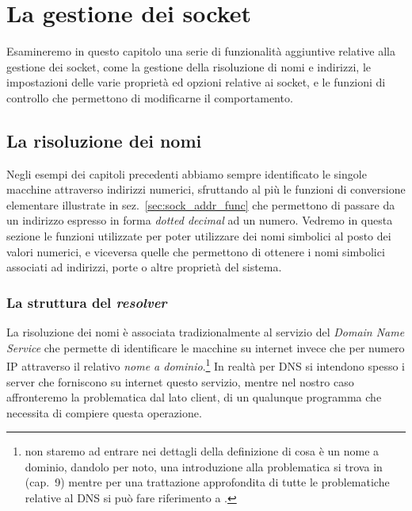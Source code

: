 
\chapter{La gestione dei socket}
\label{cha:sock_generic_management}

Esamineremo in questo capitolo una serie di funzionalità aggiuntive relative
alla gestione dei socket, come la gestione della risoluzione di nomi e
indirizzi, le impostazioni delle varie proprietà ed opzioni relative ai
socket, e le funzioni di controllo che permettono di modificarne il
comportamento.


\section{La risoluzione dei nomi}
\label{sec:sock_name_resolution}

Negli esempi dei capitoli precedenti abbiamo sempre identificato le singole
macchine attraverso indirizzi numerici, sfruttando al più le funzioni di
conversione elementare illustrate in sez.~\ref{sec:sock_addr_func} che
permettono di passare da un indirizzo espresso in forma \textit{dotted
  decimal} ad un numero. Vedremo in questa sezione le funzioni utilizzate per
poter utilizzare dei nomi simbolici al posto dei valori numerici, e viceversa
quelle che permettono di ottenere i nomi simbolici associati ad indirizzi,
porte o altre proprietà del sistema.


\subsection{La struttura del \textit{resolver}}
\label{sec:sock_resolver}

 La risoluzione dei nomi è associata tradizionalmente al
servizio del  \textit{Domain Name Service}
che permette di identificare le macchine su internet invece che per numero IP
attraverso il relativo \textsl{nome a dominio}.\footnote{non staremo ad
  entrare nei dettagli della definizione di cosa è un nome a dominio, dandolo
  per noto, una introduzione alla problematica si trova in \cite{AGL} (cap.~9)
  mentre per una trattazione approfondita di tutte le problematiche relative
  al DNS si può fare riferimento a \cite{DNSbind}.} In realtà per DNS si
intendono spesso i server che forniscono su internet questo servizio, mentre
nel nostro caso affronteremo la problematica dal lato client, di un qualunque
programma che necessita di compiere questa operazione.

